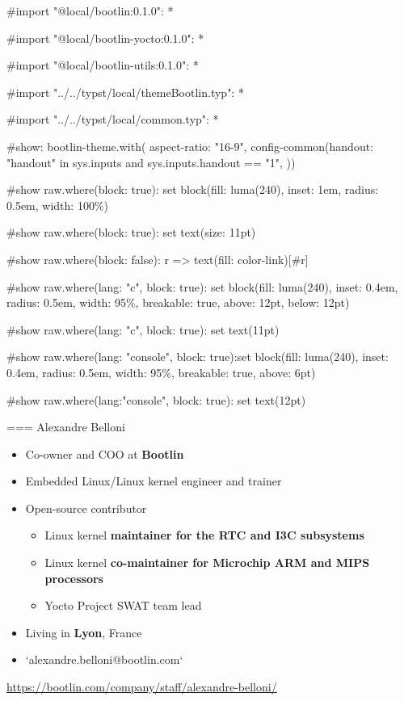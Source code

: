 #import "@local/bootlin:0.1.0": *

#import "@local/bootlin-yocto:0.1.0": *

#import "@local/bootlin-utils:0.1.0": *

#import "../../typst/local/themeBootlin.typ": *

#import "../../typst/local/common.typ": *

#show: bootlin-theme.with( aspect-ratio: "16-9", config-common(handout: "handout" in sys.inputs and sys.inputs.handout == "1", ))

#show raw.where(block: true): set block(fill: luma(240), inset: 1em, radius: 0.5em, width: 100\%)

#show raw.where(block: true): set text(size: 11pt)

#show raw.where(block: false): r => text(fill: color-link)[#r]

#show raw.where(lang: "c", block: true): set block(fill: luma(240), inset: 0.4em, radius: 0.5em, width: 95\%, breakable: true, above: 12pt, below: 12pt)

#show raw.where(lang: "c", block: true): set text(11pt)

#show raw.where(lang: "console", block: true):set block(fill: luma(240), inset: 0.4em, radius: 0.5em, width: 95\%, breakable: true, above: 6pt)

#show raw.where(lang:"console", block: true): set text(12pt)

=== {Alexandre Belloni}
    \begin{itemize}
      \item Co-owner and COO at {\bf Bootlin}
      \item Embedded Linux/Linux kernel engineer and trainer
      \item Open-source contributor
        \begin{itemize}
          \item Linux kernel {\bf maintainer for the RTC and I3C subsystems}
          \item Linux kernel {\bf co-maintainer for Microchip ARM and
            MIPS processors}
          \item Yocto Project SWAT team lead
        \end{itemize}
      \item Living in {\bf Lyon}, France
      \item `alexandre.belloni@bootlin.com`
    \end{itemize}
    {\small \url{https://bootlin.com/company/staff/alexandre-belloni/}}


